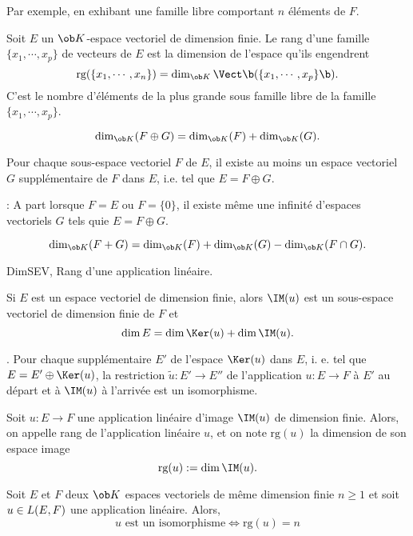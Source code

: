 Par exemple, en exhibant une famille libre comportant $n$ \'el\'ements de $F$.
\bigskip

\Definition []  Soit $E$ un $\ob K$-espace vectoriel de dimension finie. Le rang d'une famille $\{x_1,\cdots, x_p\}$ de vecteurs de $E$ est la dimension de l'espace qu'ils engendrent 
$$
{\mbox{rg}(\{x_1,\cdots,x_n\})=\dim_{\ob K}\Vect\b(\{x_1,\cdots,x_p\}\b)}.
$$ 
C'est le nombre d'\'el\'ements de la plus grande sous famille libre de la famille $\{x_1,\cdots,x_p\}$. 
\bigskip


$$
\dim_{\ob K}(F\oplus G)=\dim_{\ob K}(F)+\dim_{\ob K}(G).
$$

Pour chaque sous-espace vectoriel $F$ de $E$, il existe au moins un espace vectoriel $G$ suppl\'ementaire de $F$ dans $E$, i.e. tel que $E=F\oplus G$. 

\Remarque : A part lorsque $F=E$ ou $F=\{0\}$, il existe m\^eme une infinit\'e d'espaces vectoriels $G$ tels quie $E=F\oplus G$. 
\bigskip

$$
\dim_{\ob K}(F+G)=\dim_{\ob K}(F)+\dim_{\ob K}(G)-\dim_{\ob K}(F\cap G).
$$


\Subsection DimSEV, Rang d'une application lin\'eaire. 
\bigskip

\Theoreme [Title=Th\'eor\`eme du rang;$u:E\to F$ application lin\'eaire]
Si $E$ est un espace vectoriel de dimension finie, alors $\IM(u)$ est un 
sous-espace vectoriel de dimension finie de $F$ et  
$$
\dim E=\dim\Ker(u)+\dim\IM(u).
$$ 


\Remarque. Pour chaque suppl\'ementaire $E'$ de l'espace $\Ker(u)$ dans $E$, i. e. tel que $E=E'\oplus\Ker(u)$, la restriction $\tilde u:E'\to E''$ de l'application $u:E\to F$ \`a $E'$ au d\'epart et \`a $\IM(u)$ \`a l'arriv\'ee est un isomorphisme. 
\bigskip

\Definition []  Soit $u:E\to F$ une application lin\'eaire d'image $\IM(u)$ de dimension finie. 
Alors, on appelle rang de l'application lin\'eaire $u$, et on note $\mbox{rg}(u)$ la dimension de son espace image
$$
{\mbox{rg}(u):=\dim\IM(u)}. 
$$

\Propriete []  Soit $E$ et $F$ deux $\ob K$ espaces vectoriels de m\^eme dimension finie $n\ge1$ et soit $u\in\sc L(E,F)$ une application lin\'eaire. Alors, 
$$
u\mbox{ est un isomorphisme}\Longleftrightarrow \mbox{rg}(u)=n
$$

